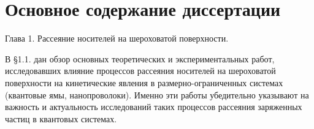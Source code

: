 \newcommand{\actuality}{\underline{\textbf{\actualityTXT}}}
\newcommand{\progress}{\underline{\textbf{\progressTXT}}}
\newcommand{\aim}{\underline{{\textbf\aimTXT}}}
\newcommand{\tasks}{\underline{\textbf{\tasksTXT}}}
\newcommand{\novelty}{\underline{\textbf{\noveltyTXT}}}
\newcommand{\influence}{\underline{\textbf{\influenceTXT}}}
\newcommand{\methods}{\underline{\textbf{\methodsTXT}}}
\newcommand{\defpositions}{\underline{\textbf{\defpositionsTXT}}}
\newcommand{\reliability}{\underline{\textbf{\reliabilityTXT}}}
\newcommand{\probation}{\underline{\textbf{\probationTXT}}}
\newcommand{\contribution}{\underline{\textbf{\contributionTXT}}}
\newcommand{\publications}{\underline{\textbf{\publicationsTXT}}}



\section*{Основное содержание диссертации}

Глава 1. Рассеяние носителей на шероховатой поверхности.

В §1.1. дан обзор основных теоретических и экспериментальных работ, исследовавших влияние процессов рассеяния носителей на шероховатой поверхности на кинетические явления в размерно-ограниченных системах (квантовые ямы, нанопроволоки). Именно эти работы убедительно указывают на важность и актуальность исследований таких процессов рассеяния заряженных частиц в квантовых системах.

